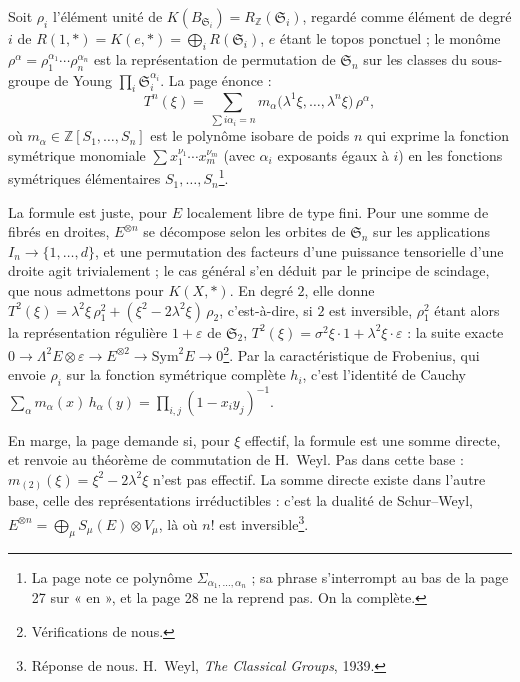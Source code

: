 \documentclass[11pt,a4paper]{article}
\begin{document}
Soit $\rho_i$ l'élément unité de $K(B_{\mathfrak{S}_i}) = R_{\mathbb{Z}}
(\mathfrak{S}_i)$, regardé comme élément de degré $i$ de
$R(1, *) = K(e, *) = \bigoplus_i R(\mathfrak{S}_i)$, $e$ étant le topos
ponctuel ; le monôme $\rho^{\alpha} = \rho_1^{\alpha_1} \cdots
\rho_n^{\alpha_n}$ est la représentation de permutation de $\mathfrak{S}_n$
sur les classes du sous-groupe de Young $\prod_i \mathfrak{S}_i^{\alpha_i}$.
La page énonce :
\[
T^{n}(\xi) = \sum_{\sum i\alpha_i = n} m_\alpha\bigl(\lambda^{1}\xi, \dots,
\lambda^{n}\xi\bigr)\, \rho^{\alpha},
\]
où $m_\alpha \in \mathbb{Z}[S_1, \dots, S_n]$ est le polynôme isobare de
poids $n$ qui exprime la fonction symétrique monomiale
$\sum x_1^{\nu_1} \cdots x_m^{\nu_m}$ (avec $\alpha_i$ exposants égaux à
$i$) en les fonctions symétriques élémentaires $S_1, \dots,
S_n$\footnote{La page note ce polynôme $\Sigma_{\alpha_1, \dots, \alpha_n}$ ;
sa phrase s'interrompt au bas de la page 27 sur « en », et la page 28 ne la
reprend pas. On la complète.}.

La formule est juste, pour $E$ localement libre de type fini. Pour une
somme de fibrés en droites, $E^{\otimes n}$ se décompose selon les orbites de
$\mathfrak{S}_n$ sur les applications $I_n \to \{1, \dots, d\}$, et une
permutation des facteurs d'une puissance tensorielle d'une droite agit
trivialement ; le cas général s'en déduit par le principe de scindage, que
nous admettons pour $K(X, *)$. En degré $2$, elle donne $T^{2}(\xi) = \lambda^{2}\xi\,\rho_1^{2} + (\xi^{2} -
2\lambda^{2}\xi)\,\rho_2$, c'est-à-dire, si $2$ est inversible,
$\rho_1^{2}$ étant alors la représentation régulière $1 + \varepsilon$ de
$\mathfrak{S}_2$,
$T^{2}(\xi) = \sigma^{2}\xi \cdot 1 + \lambda^{2}\xi \cdot \varepsilon$ : la
suite exacte $0 \to \Lambda^{2}E \otimes \varepsilon \to E^{\otimes 2} \to
\mathrm{Sym}^{2}E \to 0$\footnote{Vérifications de nous.}. Par la
caractéristique de Frobenius, qui envoie $\rho_i$ sur la fonction
symétrique complète $h_i$, c'est l'identité de Cauchy
$\sum_\alpha m_\alpha(x)\,h_\alpha(y) = \prod_{i,j}(1 - x_i y_j)^{-1}$.

En marge, la page demande si, pour $\xi$ effectif, la formule est une somme
directe, et renvoie au théorème de commutation de H.~Weyl. Pas dans cette
base : $m_{(2)}(\xi) = \xi^{2} - 2\lambda^{2}\xi$ n'est pas effectif. La
somme directe existe dans l'autre base, celle des représentations
irréductibles : c'est la dualité de Schur–Weyl,
$E^{\otimes n} = \bigoplus_\mu S_\mu(E) \otimes V_\mu$, là où $n!$ est
inversible\footnote{Réponse de nous. H.~Weyl, \emph{The Classical Groups},
1939.}.
\end{document}
